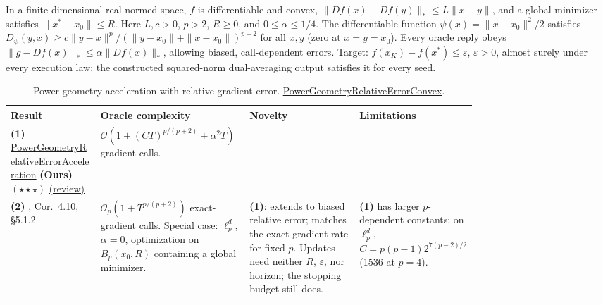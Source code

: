 \begin{table}[tp]
\centering
\caption{Power-geometry acceleration with relative gradient error. \href{https://github.com/k3nfalt/longtails/blob/main/LongTails/Setups/PowerGeometryRelativeErrorConvex.lean}{PowerGeometryRelativeErrorConvex}.}\label{tab:PowerGeometryRelativeErrorConvex}
\parbox{\linewidth}{\footnotesize In a finite-dimensional real normed space, $f$ is differentiable and convex, $\|Df(x)-Df(y)\|_*\le L\|x-y\|$, and a global minimizer satisfies $\|x^*-x_0\|\le R$. Here $L,c>0$, $p>2$, $R\ge0$, and $0\le\alpha\le1/4$. The differentiable function $\psi(x)=\|x-x_0\|^2/2$ satisfies $D_\psi(y,x)\ge c\|y-x\|^p/(\|y-x_0\|+\|x-x_0\|)^{p-2}$ for all $x,y$ (zero at $x=y=x_0$). Every oracle reply obeys $\|g-Df(x)\|_*\le\alpha\|Df(x)\|_*$, allowing biased, call-dependent errors. Target: $f(x_K)-f(x^*)\le\varepsilon$, $\varepsilon>0$, almost surely under every execution law; the constructed squared-norm dual-averaging output satisfies it for every seed.}\par\smallskip
\begin{threeparttable}
\footnotesize
\setlength{\tabcolsep}{4pt}\renewcommand{\arraystretch}{1.25}
\begin{tabularx}{\linewidth}{@{}>{\raggedright\arraybackslash}p{0.20\linewidth}>{\raggedright\arraybackslash}p{0.32\linewidth}>{\raggedright\arraybackslash}p{0.25\linewidth}>{\raggedright\arraybackslash}X@{}}
\toprule
\textbf{Result} & \textbf{Oracle complexity} & \textbf{Novelty} & \textbf{Limitations} \\
\midrule
\textbf{(1)} \href{https://github.com/k3nfalt/longtails/blob/main/LongTails/Theorems/PowerGeometryRelativeErrorAcceleration.lean}{Power\allowbreak Geometry\allowbreak Relative\allowbreak Error\allowbreak Acceleration} \textbf{(Ours)} $(\star\star\star)$ \href{https://github.com/k3nfalt/longtails/blob/main/scripts/reviews/PowerGeometryRelativeErrorAcceleration.md}{(review)}
& $\mathcal{O}\!\left(1+(CT)^{p/(p+2)}+\alpha^2T\right)$ gradient calls.
& & \\
\midrule[1.2pt]
\textbf{(2)} \citep{pgDAspremont2016v3}, Cor.~4.10, \S5.1.2
& $\mathcal{O}_p\!\left(1+T^{p/(p+2)}\right)$ exact-gradient calls. Special case: $\ell_p^d$, $\alpha=0$, optimization on $B_p(x_0,R)$ containing a global minimizer.
& \textbf{(1)}: extends to biased relative error; matches the exact-gradient rate for fixed $p$. Updates need neither $R$, $\varepsilon$, nor horizon; the stopping budget still does.
& \textbf{(1)} has larger $p$-dependent constants; on $\ell_p^d$, $C=p(p-1)2^{7(p-2)/2}$ (1536 at $p=4$). \\

\end{tabularx}
\end{threeparttable}
\end{table}
